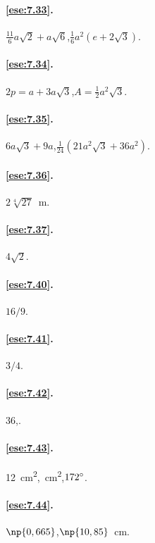\paragraph{\ref{ese:7.33}.}
$\frac{11}{6}a\sqrt{2}+a\sqrt{6}$,\quad $\frac{1}{6}a^2(e+2\sqrt{3})$.

\paragraph{\ref{ese:7.34}.}
$2p=a+3a\sqrt{3}$,\quad $A=\frac{1}{2}a^2\sqrt{3}$.

\paragraph{\ref{ese:7.35}.}
$6a\sqrt{3}+9a$,\quad $\frac{1}{24}(21a^2\sqrt{3}+36a^2)$.

\paragraph{\ref{ese:7.36}.}
$2\sqrt[4]{27}$~m.

\paragraph{\ref{ese:7.37}.}
$4\sqrt{2}$.

\paragraph{\ref{ese:7.40}.}
$16/9$.

\paragraph{\ref{ese:7.41}.}
$3/4$.

\paragraph{\ref{ese:7.42}.}
36,.

\paragraph{\ref{ese:7.43}.}
12~cm\textsuperscript{2},~cm\textsuperscript{2},\quad $172{}^{\circ}$.

\paragraph{\ref{ese:7.44}.}
$\np{0,665}$,\quad $\np{10,85}$~cm.

